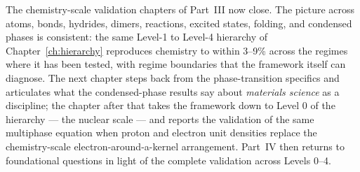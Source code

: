 The chemistry-scale validation chapters of Part~III now close. The picture across atoms, bonds, hydrides, dimers, reactions, excited states, folding, and condensed phases is consistent: the same Level-1 to Level-4 hierarchy of Chapter~\ref{ch:hierarchy} reproduces chemistry to within 3--9\% across the regimes where it has been tested, with regime boundaries that the framework itself can diagnose. The next chapter steps back from the phase-transition specifics and articulates what the condensed-phase results say about \emph{materials science} as a discipline; the chapter after that takes the framework down to Level 0 of the hierarchy --- the nuclear scale --- and reports the validation of the same multiphase equation when proton and electron unit densities replace the chemistry-scale electron-around-a-kernel arrangement. Part~IV then returns to foundational questions in light of the complete validation across Levels 0--4.

